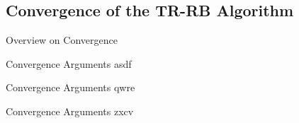 \subsection{Convergence of the TR-RB Algorithm}

\begin{frame}{Overview on Convergence}
\end{frame}

\begin{frame}{Convergence Arguments}
    asdf~\cite{Qian2017}
\end{frame}

\begin{frame}{Convergence Arguments}
    qwre~\cite{Keil2021}
\end{frame}

\begin{frame}{Convergence Arguments}
    zxcv~\cite{Banholzer2020}
\end{frame}